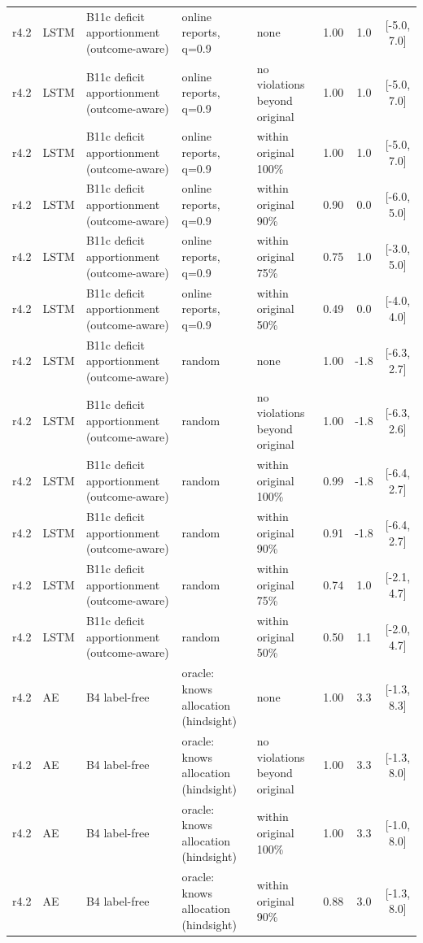 \documentclass[10pt,onecolumn,letterpaper]{article}
\begin{document}
\begin{longtable}{lllp{4.2cm}p{3.4cm}ccc}
r4.2 & LSTM & B11c deficit apportionment (outcome-aware) & online reports, q=0.9 & none & 1.00 & 1.0 & [-5.0, 7.0] \\
r4.2 & LSTM & B11c deficit apportionment (outcome-aware) & online reports, q=0.9 & no violations beyond original & 1.00 & 1.0 & [-5.0, 7.0] \\
r4.2 & LSTM & B11c deficit apportionment (outcome-aware) & online reports, q=0.9 & within original 100\% & 1.00 & 1.0 & [-5.0, 7.0] \\
r4.2 & LSTM & B11c deficit apportionment (outcome-aware) & online reports, q=0.9 & within original 90\% & 0.90 & 0.0 & [-6.0, 5.0] \\
r4.2 & LSTM & B11c deficit apportionment (outcome-aware) & online reports, q=0.9 & within original 75\% & 0.75 & 1.0 & [-3.0, 5.0] \\
r4.2 & LSTM & B11c deficit apportionment (outcome-aware) & online reports, q=0.9 & within original 50\% & 0.49 & 0.0 & [-4.0, 4.0] \\
r4.2 & LSTM & B11c deficit apportionment (outcome-aware) & random & none & 1.00 & -1.8 & [-6.3, 2.7] \\
r4.2 & LSTM & B11c deficit apportionment (outcome-aware) & random & no violations beyond original & 1.00 & -1.8 & [-6.3, 2.6] \\
r4.2 & LSTM & B11c deficit apportionment (outcome-aware) & random & within original 100\% & 0.99 & -1.8 & [-6.4, 2.7] \\
r4.2 & LSTM & B11c deficit apportionment (outcome-aware) & random & within original 90\% & 0.91 & -1.8 & [-6.4, 2.7] \\
r4.2 & LSTM & B11c deficit apportionment (outcome-aware) & random & within original 75\% & 0.74 & 1.0 & [-2.1, 4.7] \\
r4.2 & LSTM & B11c deficit apportionment (outcome-aware) & random & within original 50\% & 0.50 & 1.1 & [-2.0, 4.7] \\
r4.2 & AE & B4 label-free & oracle: knows allocation (hindsight) & none & 1.00 & 3.3 & [-1.3, 8.3] \\
r4.2 & AE & B4 label-free & oracle: knows allocation (hindsight) & no violations beyond original & 1.00 & 3.3 & [-1.3, 8.0] \\
r4.2 & AE & B4 label-free & oracle: knows allocation (hindsight) & within original 100\% & 1.00 & 3.3 & [-1.0, 8.0] \\
r4.2 & AE & B4 label-free & oracle: knows allocation (hindsight) & within original 90\% & 0.88 & 3.0 & [-1.3, 8.0] \\

\end{longtable}
\end{document}
